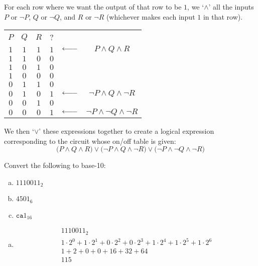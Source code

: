 \documentclass[12pt,letterpaper]{exam}
\DeclareRobustCommand{\longerleftarrow}{\DOTSB\leftarrow\joinrel\relbar\joinrel\relbar} %
\begin{document}
\begin{questions}
\sol For each row where we want the output of that row to be $1$, we `$\wedge$' all the inputs $P$ or $\neg P$, $Q$ or $\neg Q$, and $R$ or $\neg R$ (whichever makes each input $1$ in that row). \par
	\begin{table}[h]
	\centering
	\begin{tabular}{c|c|c|c lc}
	$P$ & $Q$ & $R$ & ? \\ \cline{1-4}
	$1$ & $1$ & $1$ & $1$ & $\longerleftarrow$ & $P \wedge Q \wedge R$ \\
	$1$ & $1$ & $0$ & $0$ \\
	$1$ & $0$ & $1$ & $0$ \\
	$1$ & $0$ & $0$ & $0$ \\
	$0$ & $1$ & $1$ & $0$ \\
	$0$ & $1$ & $0$ & $1$ & $\longerleftarrow$ & $\neg P \wedge Q \wedge \neg R$ \\
	$0$ & $0$ & $1$ & $0$ \\
	$0$ & $0$ & $0$ & $1$ & $\longerleftarrow$ & $\neg P \wedge \neg Q \wedge \neg R$
	\end{tabular}
	\end{table} \par
We then `$\vee$' these expressions together to create a logical expression corresponding to the circuit whose on/off table is given:
	\[
	\big(P \wedge Q \wedge R \big) \vee \big(\neg P \wedge Q \wedge \neg R \big) \vee \big(\neg P \wedge \neg Q \wedge \neg R \big)
	\]



\newpage
\question[10] Convert the following to base-10:
	\begin{enumerate}[(a)]
	\item $1110011_2$
	\item $4501_6$
	\item $\texttt{ca}1_{16}$
	\end{enumerate} \pspace

\sol 
\begin{enumerate}[(a)]
\item 
	\[
	\begin{gathered}
	1110011_2 \\[0.2cm]
	1 \cdot 2^0 + 1 \cdot 2^1 + 0 \cdot 2^2 + 0 \cdot 2^3 + 1 \cdot 2^4 + 1 \cdot 2^5 + 1 \cdot 2^6 \\[0.3cm]
	1 + 2 + 0 + 0 + 16 + 32 + 64 \\[0.2cm]
	115
	\end{gathered}
	\] \pspace


\end{enumerate}
\end{questions}
\end{document}

